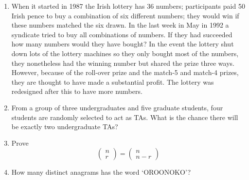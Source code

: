 \documentclass[11pt,a4paper]{scrartcl}
\begin{document}
\begin{enumerate}

\item When it started in 1987 the Irish lottery has 36 numbers;
  participants paid 50 Irish pence to buy a combination of six
  different numbers; they would win if these numbers matched the six
  drawn. In the last week in May in 1992 a syndicate tried to buy all
  combinations of numbers. If they had succeeded how many numbers
  would they have bought? In the event the lottery shut down lots of
  the lottery machines so they only bought most of the numbers, they
  nonetheless had the winning number but shared the prize three
  ways. However, because of the roll-over prize and the match-5 and
  match-4 prizes, they are thought to have made a substantial
  profit. The lottery was redesigned after this to have more numbers.


\item From a group of three undergraduates and five graduate students,
  four students are randomly selected to act as TAs. What is the
  chance there will be exactly two undergraduate TAs?

\item Prove
\begin{equation}
\left(\begin{array}{c}n\\r\end{array}\right)=\left(\begin{array}{c}n\\n-r\end{array}\right)
\end{equation}

\item How many distinct anagrams has the word `OROONOKO'?


\end{enumerate}
\end{document}
